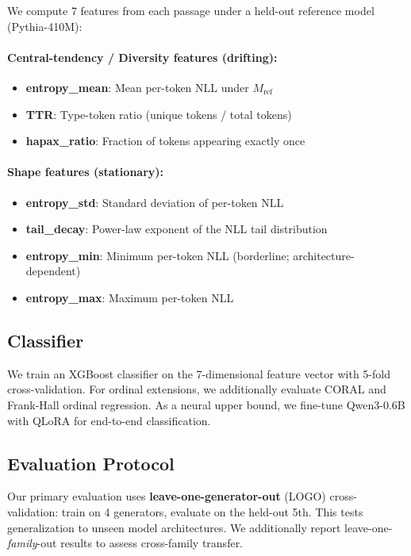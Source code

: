\documentclass[11pt,a4paper]{article}
\begin{document}
We compute 7 features from each passage under a held-out reference model (Pythia-410M):

\paragraph{Central-tendency / Diversity features (drifting):}
\begin{itemize}
    \item \textbf{entropy\_mean}: Mean per-token NLL under $M_{\text{ref}}$
    \item \textbf{TTR}: Type-token ratio (unique tokens / total tokens)
    \item \textbf{hapax\_ratio}: Fraction of tokens appearing exactly once
\end{itemize}

\paragraph{Shape features (stationary):}
\begin{itemize}
    \item \textbf{entropy\_std}: Standard deviation of per-token NLL
    \item \textbf{tail\_decay}: Power-law exponent of the NLL tail distribution
    \item \textbf{entropy\_min}: Minimum per-token NLL (borderline; architecture-dependent)
    \item \textbf{entropy\_max}: Maximum per-token NLL
\end{itemize}

\subsection{Classifier}

We train an XGBoost classifier on the 7-dimensional feature vector with 5-fold cross-validation.
For ordinal extensions, we additionally evaluate CORAL and Frank-Hall ordinal regression.
As a neural upper bound, we fine-tune Qwen3-0.6B with QLoRA for end-to-end classification.

\subsection{Evaluation Protocol}

Our primary evaluation uses \textbf{leave-one-generator-out} (LOGO) cross-validation: train on 4 generators, evaluate on the held-out 5th.
This tests generalization to unseen model architectures.
We additionally report leave-one-\emph{family}-out results to assess cross-family transfer.
\end{document}
